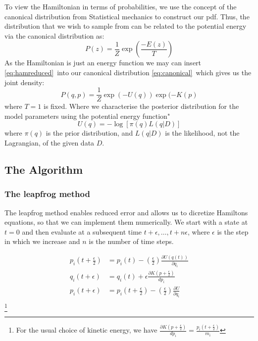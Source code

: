 \documentclass[]{report}
\begin{document}
To view the Hamiltonian in terms of probabilities, we use the concept of the canonical distribution from Statistical mechanics to construct our pdf. Thus, the distribution that we wish to sample from can be related to the potential energy via the canonical distribution as:
\begin{equation}
\label{eq:canonical}
P(z) = \frac{1}{Z}\exp\left(\frac{-E(z)}{T}\right)
\end{equation}
As the Hamiltonian is just an energy function we may can insert \ref{eq:hamreduced}\ into our canonical distribution \ref{eq:canonical}\, which gives us the joint density:
\begin{equation}
P(q,p) = \frac{1}{Z}\exp(-U(q))\exp(-K(p)  
\end{equation}
where $T = 1$ is fixed. 
Where we characterise the posterior distribution for the model parameters using the potential energy function" \begin{equation}
U(q) = -\log[\pi(q)L(q|D)]
\end{equation}
where $\pi(q)$ is the prior distribution, and $L(q|D)$ is the likelihood, not the Lagrangian, of the given data $D$. 

\subsection{The Algorithm}

\subsubsection{The leapfrog method}
The leapfrog method enables reduced error and allows us to dicretize Hamiltons equations, so that we can implement them numerically. 
We start with a state at $t = 0$ and then evaluate at a subsequent time $t + \epsilon , \hdots, t + n\epsilon$, where $\epsilon$ is the step in which we increase and $n$ is the number of time steps. 

\begin{align}
p_{i}(t + \frac{\epsilon}{2}) &= p_{i}(t) - \left(\frac{\epsilon}{2}\right)\frac{\partial U(q(t))}{\partial q_{i}} \\
q_{i}(t + \epsilon) &= q_{i}(t) + \epsilon\frac{\partial K(p + \frac{\epsilon}{2})}{dp_{i}}\\
p_{i}(t + \epsilon) &= p_{i}(t + \frac{\epsilon}{2}) - \left(\frac{\epsilon}{2}\right)\frac{\partial U}{\partial q_{i}}\\
\end{align}
\footnote{For the usual choice of kinetic energy, we have $\frac{\partial K(p + \frac{\epsilon}{2})}{dp_{i}} = \frac{p_{i}(t + \frac{\epsilon}{2})}{m_{i}}$}
\end{document}
